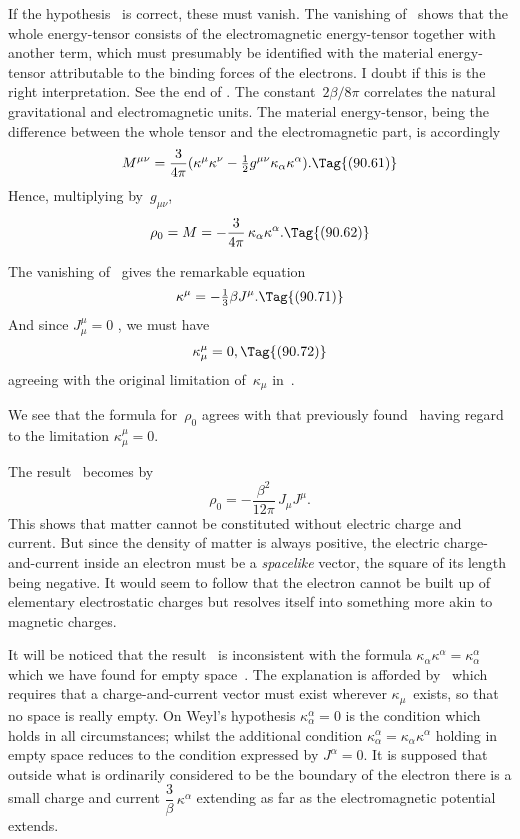 \documentclass[12pt]{book}
\begin{document}
If the hypothesis~ is correct, these must vanish. The vanishing of~
shows that the whole energy-tensor consists of the electromagnetic
energy-tensor together with another term, which must presumably be identified
with the material energy-tensor attributable to the binding forces of the
electrons\footnotemark.\footnotetext
  {I doubt if this is the right interpretation. See the end of .}
The constant~$2\beta/8\pi$ correlates the natural gravitational and
electromagnetic units. The material energy-tensor, being the difference between
the whole tensor and the electromagnetic part, is accordingly
\[
M^{\mu\nu} = \frac{3}{4\pi} (\kappa^{\mu} \kappa^{\nu} - \tfrac{1}{2} g^{\mu\nu} \kappa_{\alpha} \kappa^{\alpha}).
\Tag{(90.61)}
\]
Hence, multiplying by~$g_{\mu\nu}$,
\[
\rho_{0} = M = -\frac{3}{4\pi}\, \kappa_{\alpha} \kappa^{\alpha}.
\Tag{(90.62)}
\]

The vanishing of~ gives the remarkable equation
\[
\kappa^{\mu} = -\tfrac{1}{3}\beta J^{\mu}.
\Tag{(90.71)}
\]
And since $J_{\mu}^{\mu} = 0$ , we must have
\[
\kappa_{\mu}^{\mu} = 0,
\Tag{(90.72)}
\]
agreeing with the original limitation of~$\kappa_{\mu}$ in~.

We see that the formula for~$\rho_{0}$  agrees with that previously found~
having regard to the limitation $\kappa_{\mu}^{\mu} = 0$.

The result~ becomes by~
\[
\rho_{0} = -\frac{\beta^{2}}{12\pi}\, J_{\mu} J^{\mu}.
\]
This shows that matter cannot be constituted without electric charge and
current. But since the density of matter is always positive, the electric charge-and-current
inside an electron must be a \emph{spacelike} vector, the square of its
%
%
length being negative. It would seem to follow that the electron cannot be
built up of elementary electrostatic charges but resolves itself into something
more akin to magnetic charges.

It will be noticed that the result~ is inconsistent with the formula
$\kappa_{\alpha} \kappa^{\alpha} = \kappa_{\alpha}^{\alpha}$ which we have found for empty space~. The explanation is afforded
by~ which requires that a charge-and-current vector must exist wherever
$\kappa_{\mu}$~exists, so that no space is really empty. On Weyl's hypothesis $\kappa_{\alpha}^{\alpha} = 0$ is the
condition which holds in all circumstances; whilst the additional condition
$\kappa_{\alpha}^{\alpha} = \kappa_{\alpha} \kappa^{\alpha}$ holding in empty space reduces to the condition expressed by $J^{\alpha} = 0$.
It is supposed that outside what is ordinarily considered to be the boundary
of the electron there is a small charge and current $\dfrac{3}{\beta}\, \kappa^{\alpha}$ extending as far as the
electromagnetic potential extends.
\end{document}
